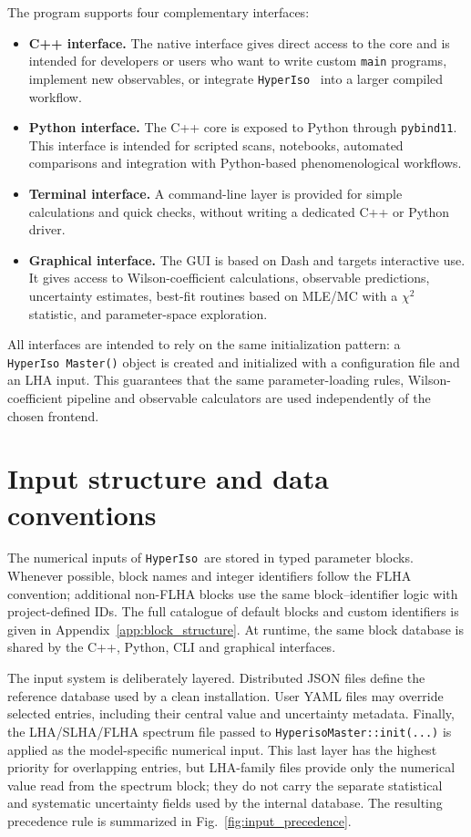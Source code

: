 \documentclass[preprint,11pt]{elsarticle}
\newcommand{\hi}{\texttt{HyperIso}}
\begin{document}
The program supports four complementary interfaces:
\begin{itemize}
    \item \textbf{C++ interface.} The native interface gives direct access to the core and is intended for developers or users who want to write custom \texttt{main} programs, implement new observables, or integrate \hi~ into a larger compiled workflow.
    \item \textbf{Python interface.} The C++ core is exposed to Python through \texttt{pybind11}. This interface is intended for scripted scans, notebooks, automated comparisons and integration with Python-based phenomenological workflows.
    \item \textbf{Terminal interface.} A command-line layer is provided for simple calculations and quick checks, without writing a dedicated C++ or Python driver.
    \item \textbf{Graphical interface.} The GUI is based on Dash and targets interactive use. It gives access to Wilson-coefficient calculations, observable predictions, uncertainty estimates, best-fit routines based on MLE/MC with a $\chi^2$ statistic, and parameter-space exploration.
\end{itemize}

All interfaces are intended to rely on the same initialization pattern: a \texttt{\hi~Master()} object is created and initialized with a configuration file and an LHA input. This guarantees that the same parameter-loading rules, Wilson-coefficient pipeline and observable calculators are used independently of the chosen frontend.

\section{Input structure and data conventions}
\label{sec:input_structure}

The numerical inputs of \hi~are stored in typed parameter blocks.  Whenever possible, block names and integer identifiers follow the FLHA convention; additional non-FLHA blocks use the same block--identifier logic with project-defined IDs.  The full catalogue of default blocks and custom identifiers is given in Appendix~\ref{app:block_structure}.  At runtime, the same block database is shared by the C++, Python, CLI and graphical interfaces.

The input system is deliberately layered.  Distributed JSON files define the reference database used by a clean installation.  User YAML files may override selected entries, including their central value and uncertainty metadata.  Finally, the LHA/SLHA/FLHA spectrum file passed to \texttt{HyperisoMaster::init(...)} is applied as the model-specific numerical input.  This last layer has the highest priority for overlapping entries, but LHA-family files provide only the numerical value read from the spectrum block; they do not carry the separate statistical and systematic uncertainty fields used by the internal database.  The resulting precedence rule is summarized in Fig.~\ref{fig:input_precedence}.
\end{document}
